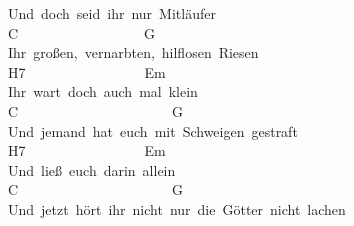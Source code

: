 \documentclass[]{book}
\begin{document}
Und~doch~seid~ihr~nur~Mitläufer~\\
\hspace*{0.333em}\hspace*{0.333em}\hspace*{0.333em}\hspace*{0.333em}\hspace*{0.333em}\hspace*{0.333em}C~~~~~~~~~~~~~~~~~~G\\
Ihr~großen,~vernarbten,~hilflosen~Riesen~\\
\hspace*{0.333em}\hspace*{0.333em}\hspace*{0.333em}\hspace*{0.333em}\hspace*{0.333em}H7~~~~~~~~~~~~~~~~~Em~\\
Ihr~wart~doch~auch~mal~klein\\
\hspace*{0.333em}\hspace*{0.333em}\hspace*{0.333em}\hspace*{0.333em}\hspace*{0.333em}C~~~~~~~~~~~~~~~~~~~~~~G\\
Und~jemand~hat~euch~mit~Schweigen~gestraft~\\
\hspace*{0.333em}\hspace*{0.333em}\hspace*{0.333em}\hspace*{0.333em}\hspace*{0.333em}H7~~~~~~~~~~~~~~~~~Em\\
Und~ließ~euch~darin~allein~\\
\hspace*{0.333em}\hspace*{0.333em}\hspace*{0.333em}\hspace*{0.333em}\hspace*{0.333em}\hspace*{0.333em}\hspace*{0.333em}\hspace*{0.333em}\hspace*{0.333em}\hspace*{0.333em}\hspace*{0.333em}C~~~~~~~~~~~~~~~~~~~~~~G\\
Und~jetzt~hört~ihr~nicht~nur~die~Götter~nicht~lachen~\\
\end{document}
